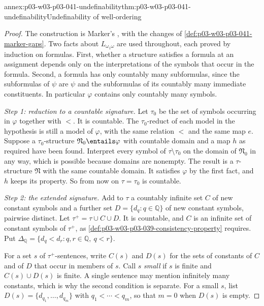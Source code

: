 \begin{annexitem}{annex:p03-w03-p03-041-undefinability}{thm:p03-w03-p03-041-undefinability}{Undefinability of well-ordering}
\begin{proof}
The construction is Marker's
\cite[proof after Corollary~4.28, pp.~52--53]{Marker2014InfinitaryNotes},
with the changes of \cref{def:p03-w03-p03-041-marker-gaps}. Two facts
about \(L_{\omega_1\omega}\) are used throughout, each proved by induction
on formulas. First, whether a structure satisfies a formula at an
assignment depends only on the interpretations of the symbols that occur
in the formula. Second, a formula has only countably many subformulas,
since the subformulas of \(\psi\) are \(\psi\) and the subformulas of its
countably many immediate constituents. In particular \(\varphi\) contains
only countably many symbols.

\emph{Step 1: reduction to a countable signature.} Let \(\tau_0\) be the
set of symbols occurring in \(\varphi\) together with \(<\). It is
countable. The \(\tau_0\)-reduct of each model in the hypothesis is still
a model of \(\varphi\), with the same relation \(<\) and the same map
\(e\). Suppose a \(\tau_0\)-structure \(\mathfrak N_0\entails\varphi\)
with countable domain and a map \(h\) as required have been found.
Interpret every symbol of \(\tau\setminus\tau_0\) on the domain of
\(\mathfrak N_0\) in any way, which is possible because domains are
nonempty. The result is a \(\tau\)-structure \(\mathfrak N\) with the same
countable domain. It satisfies \(\varphi\) by the first fact, and \(h\)
keeps its property. So from now on \(\tau=\tau_0\) is countable.

\emph{Step 2: the extended signature.} Add to \(\tau\) a countably
infinite set \(C\) of new constant symbols and a further set
\(D=\{d_q:q\in\mathbb Q\}\) of new constant symbols, pairwise distinct.
Let \(\tau^{+}=\tau\cup C\cup D\). It is countable, and \(C\) is an
infinite set of constant symbols of \(\tau^{+}\), as
\cref{def:p03-w03-p03-039-consistency-property} requires. Put
\(\Delta_{\mathbb Q}=\{d_q<d_r:q,r\in\mathbb Q,\ q<r\}\).

For a set \(s\) of \(\tau^{+}\)-sentences, write \(C(s)\) and \(D(s)\)
for the sets of constants of \(C\) and of \(D\) that occur in members of
\(s\). Call \(s\) \emph{small} if \(s\) is finite and \(C(s)\cup D(s)\) is
finite. A single sentence may mention infinitely many constants, which is
why the second condition is separate. For a small \(s\), list
\(D(s)=\{d_{q_1},\ldots,d_{q_m}\}\) with \(q_1<\cdots<q_m\), so that
\(m=0\) when \(D(s)\) is empty.


\end{proof}
\end{annexitem}
